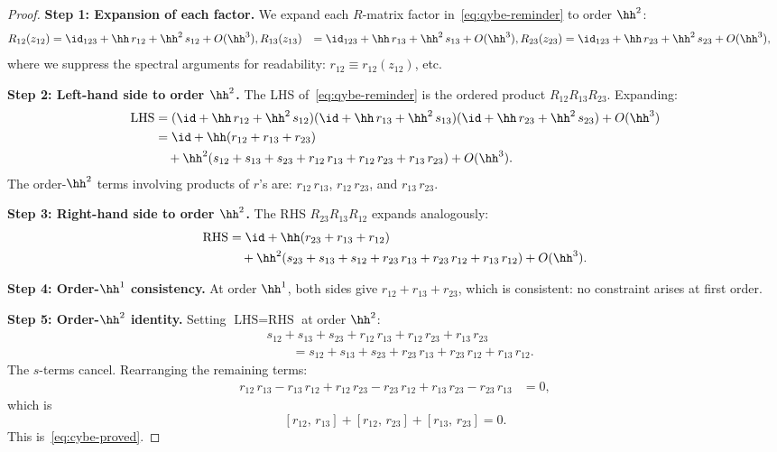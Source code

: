 \begin{proof}
\noindent\textbf{Step 1: Expansion of each factor.}
We expand each $R$-matrix factor in~\eqref{eq:qybe-reminder} to
order $\hh^2$:
\begin{align}
R_{12}(z_{12}) &= \id_{123} + \hh\, r_{12} + \hh^2\, s_{12}
+ O(\hh^3), %
R_{13}(z_{13}) &= \id_{123} + \hh\, r_{13} + \hh^2\, s_{13}
+ O(\hh^3), %
R_{23}(z_{23}) &= \id_{123} + \hh\, r_{23} + \hh^2\, s_{23}
+ O(\hh^3), %
\end{align}
where we suppress the spectral arguments for readability:
$r_{12} \equiv r_{12}(z_{12})$, etc.

\medskip
\noindent\textbf{Step 2: Left-hand side to order $\hh^2$.}
The LHS of~\eqref{eq:qybe-reminder} is the ordered product
$R_{12} R_{13} R_{23}$. Expanding:
\begin{align*}
\text{LHS} &= (\id + \hh\, r_{12} + \hh^2\, s_{12})
(\id + \hh\, r_{13} + \hh^2\, s_{13})
(\id + \hh\, r_{23} + \hh^2\, s_{23}) + O(\hh^3) \\
&= \id + \hh(r_{12} + r_{13} + r_{23}) \\
&\quad + \hh^2(s_{12} + s_{13} + s_{23}
+ r_{12}\, r_{13} + r_{12}\, r_{23} + r_{13}\, r_{23})
+ O(\hh^3).
\end{align*}
The order-$\hh^2$ terms involving products of $r$'s are:
$r_{12}\, r_{13}$, $r_{12}\, r_{23}$, and $r_{13}\, r_{23}$.

\medskip
\noindent\textbf{Step 3: Right-hand side to order $\hh^2$.}
The RHS $R_{23} R_{13} R_{12}$ expands analogously:
\begin{align*}
\text{RHS} &= \id + \hh(r_{23} + r_{13} + r_{12}) \\
&\quad + \hh^2(s_{23} + s_{13} + s_{12}
+ r_{23}\, r_{13} + r_{23}\, r_{12} + r_{13}\, r_{12})
+ O(\hh^3).
\end{align*}

\medskip
\noindent\textbf{Step 4: Order-$\hh^1$ consistency.}
At order $\hh^1$, both sides give $r_{12} + r_{13} + r_{23}$,
which is consistent: no constraint arises at first order.

\medskip
\noindent\textbf{Step 5: Order-$\hh^2$ identity.}
Setting $\text{LHS} = \text{RHS}$ at order $\hh^2$:
\begin{align*}
&s_{12} + s_{13} + s_{23}
+ r_{12}\, r_{13} + r_{12}\, r_{23} + r_{13}\, r_{23} \\
&\qquad = s_{12} + s_{13} + s_{23}
+ r_{23}\, r_{13} + r_{23}\, r_{12} + r_{13}\, r_{12}.
\end{align*}
The $s$-terms cancel. Rearranging the remaining terms:
\begin{align*}
r_{12}\, r_{13} - r_{13}\, r_{12}
+ r_{12}\, r_{23} - r_{23}\, r_{12}
+ r_{13}\, r_{23} - r_{23}\, r_{13} &= 0,
\end{align*}
which is
\[
[r_{12},\, r_{13}] + [r_{12},\, r_{23}] + [r_{13},\, r_{23}] = 0.
\]
This is~\eqref{eq:cybe-proved}.


\end{proof}
